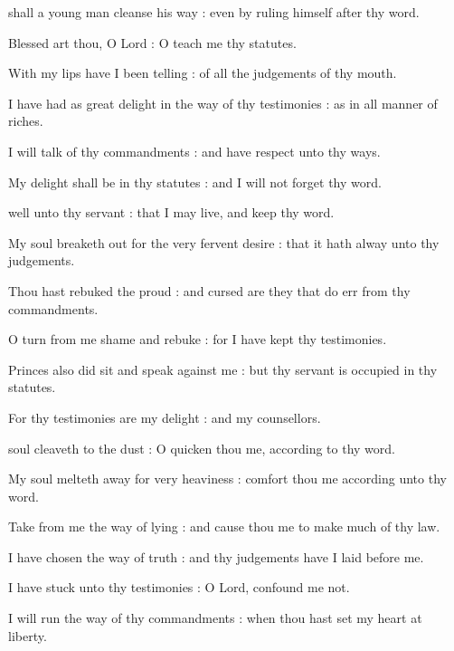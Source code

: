  shall a young man cleanse his way : even by ruling himself after thy word.\par
{}
Blessed art thou, O Lord : O teach me thy statutes.\par
{}With my lips have I been telling : of all the judgements of thy mouth.\par
{}I have had as great delight in the way of thy testimonies : as in all manner of riches.\par
{}I will talk of thy commandments : and have respect unto thy ways.\par
{}My delight shall be in thy statutes : and I will not forget thy word.\par

 well unto thy servant : that I may live, and keep thy word.\par
{}
My soul breaketh out for the very fervent desire : that it hath alway unto thy judgements.\par
{}Thou hast rebuked the proud : and cursed are they that do err from thy commandments.\par
{}O turn from me shame and rebuke : for I have kept thy testimonies.\par
{}Princes also did sit and speak against me : but thy servant is occupied in thy statutes.\par
{}For thy testimonies are my delight : and my counsellors.\par

 soul cleaveth to the dust : O quicken thou me, according to thy word.\par
{}
My soul melteth away for very heaviness : comfort thou me according unto thy word.\par
{}Take from me the way of lying : and cause thou me to make much of thy law.\par
{}I have chosen the way of truth : and thy judgements have I laid before me.\par
{}I have stuck unto thy testimonies : O Lord, confound me not.\par
{}I will run the way of thy commandments : when thou hast set my heart at liberty.\par


